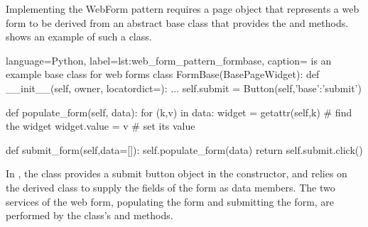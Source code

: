 Implementing the WebForm pattern requires a page object that represents a web
form to be derived from an abstract base class that provides the
 and  methods.
 shows an example of such a class.




\begin{xcode}{%
  language=Python,%
  label=lst:web_form_pattern_formbase,%
  caption={ is an example base class for web forms}%
}
class FormBase(BasePageWidget):
    def __init__(self, owner, locatordict={}):
        ...
        self.submit = Button(self,{'base':'submit'})

    def populate_form(self, data):
        for (k,v) in data:
            widget = getattr(self,k)    # find the widget
            widget.value = v            # set its value

    def submit_form(self,data=[]):
        self.populate_form(data)
        return self.submit.click()
\end{xcode}

In , the  class provides
a submit button object in the constructor, and relies on the derived class to
supply the fields of the form as data members. The two services of the web
form, populating the form and submitting the form, are performed by the class's
 and  methods.

